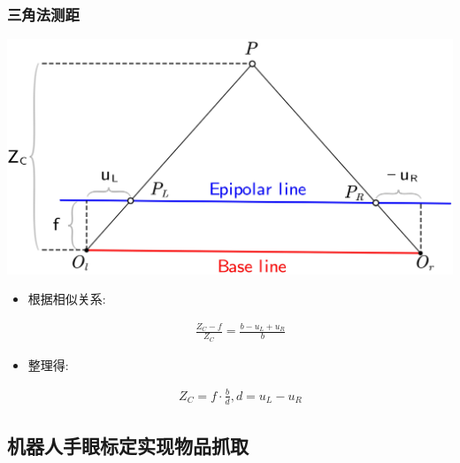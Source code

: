 \documentclass[aspectratio=43]{beamer}
\begin{document}
		\begin{frame}
		\frametitle{三角法测距}
		\begin{center}
			\includegraphics[scale=0.55]{双目相机-极线校正2}
		\end{center}		
		\begin{itemize}
			\item 根据相似关系:
			\begin{small}
			\begin{equation}
			\begin{aligned}
				\frac{Z_C-f}{Z_C}=\frac{b-u_L+u_R}{b}		
			\end{aligned}	
			\end{equation}
			\end{small}
			\item 整理得:
			\begin{small}	
			\begin{equation}
			\begin{aligned}
				Z_C=f\cdot \frac{b}{d},    d=u_L-u_R
			\end{aligned}	
			\end{equation}
			\end{small}
		\end{itemize}
		\end{frame}


	
	\subsection{机器人手眼标定实现物品抓取}
\end{document}
